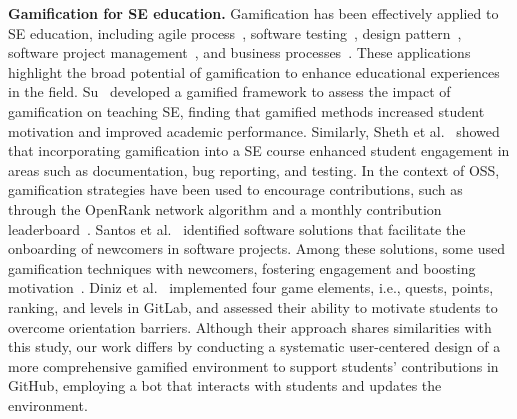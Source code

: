 
\textbf{Gamification for SE education.} Gamification has been effectively applied to SE education, including agile process~\cite{prause2012field}, software testing~\cite{rojas2016teaching, garaccione2022gerry, ozturk2022gamification}, design pattern~\cite{bartel2016gamifying}, software project management~\cite{annunziata2024serge, navarro2007comprehensive}, and business processes~\cite{garaccione2024gamification}. These applications highlight the broad potential of gamification to enhance educational experiences in the field. Su~\cite{su2016effects} developed a gamified framework to assess the impact of gamification on teaching SE, finding that gamified methods increased student motivation and improved academic performance. Similarly, Sheth et al.~\cite{sheth2012increasing} showed that incorporating gamification into a SE course enhanced student engagement in areas such as documentation, bug reporting, and testing. In the context of OSS, gamification strategies have been used to encourage contributions, such as through the OpenRank network algorithm and a monthly contribution leaderboard~\cite{zhao152023motivating}. Santos et al.~\cite{santoslr} identified software solutions that facilitate the onboarding of newcomers in software projects. Among these solutions, some used gamification techniques with newcomers, fostering engagement and boosting motivation~\cite{PS04diniz2017using, PS17toscani2018gamification}. Diniz et al.~\cite{PS04diniz2017using} implemented four game elements, i.e., quests, points, ranking, and levels in GitLab, and assessed their ability to motivate students to overcome orientation barriers. Although their approach shares similarities with this study, our work differs by conducting a systematic user-centered design of a more comprehensive gamified environment to support students' contributions in GitHub, employing a bot that interacts with students and updates the environment.  

